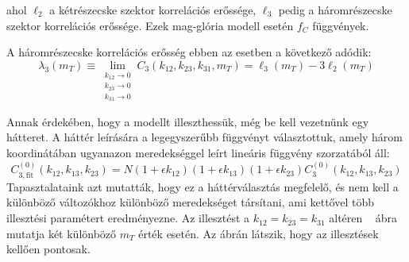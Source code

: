 \documentclass[11pt,a4paper]{article}
\numberwithin{equation}{subsection}
\numberwithin{figure}{section}
\begin{document}
ahol $\ell_2$ a kétrészecske szektor korrelációs erőssége, $\ell_3$ pedig a háromrészecske szektor korrelációs erőssége. Ezek mag-glória modell esetén $f_C$ függvények.

A háromrészecske korrelációs erősség ebben az esetben a következő adódik:
\begin{equation}
\lambda_3(m_T) \equiv \lim_{\substack{k_{12}\rightarrow 0\\ k_{23}\rightarrow 0\\ k_{31}\rightarrow 0}} C_3(k_{12},k_{23}, k_{31}, m_T) = \ell_3(m_T)-3\ell_2(m_T)
\end{equation}


Annak érdekében, hogy a modellt illeszthessük, még be kell vezetnünk egy hátteret. A háttér leírására a legegyszerűbb függvényt választottuk, amely három koordinátában ugyanazon meredekséggel leírt lineáris függvény szorzatából áll:
\begin{equation}
C_{3, \mathrm{fit}}^{(0)}(k_{12}, k_{13}, k_{23})= N(1+\epsilon k_{12})(1+\epsilon k_{13})(1+\epsilon k_{23})C_3^{(0)}(k_{12}, k_{13}, k_{23})
\end{equation}
Tapasztalataink azt mutatták, hogy ez a háttérválasztás megfelelő, és nem kell a különböző változókhoz különböző meredekséget társítani, ami kettővel több illesztési paramétert eredményezne. Az illesztést a $k_{12}=k_{23}=k_{31}$ altéren ~ ábra mutatja két különböző $m_T$ érték esetén. Az ábrán látszik, hogy az illesztések kellően pontosak.
\end{document}
